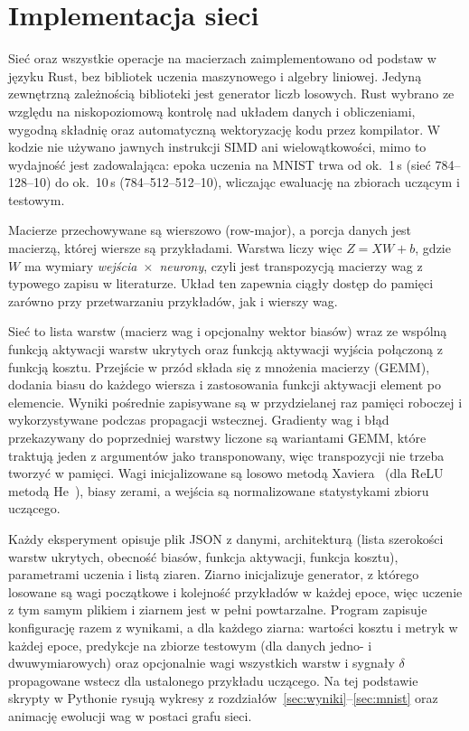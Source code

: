 \documentclass{article}
\begin{document}
\section{Implementacja sieci}
\label{sec:impl}

Sieć oraz wszystkie operacje na macierzach zaimplementowano od podstaw w języku Rust, bez bibliotek
uczenia maszynowego i algebry liniowej. Jedyną zewnętrzną zależnością biblioteki jest generator liczb
losowych. Rust wybrano ze względu na niskopoziomową kontrolę nad układem danych i obliczeniami,
wygodną składnię oraz automatyczną wektoryzację kodu przez kompilator. W kodzie nie używano jawnych
instrukcji SIMD ani wielowątkowości, mimo to wydajność jest zadowalająca: epoka uczenia na MNIST trwa
od ok.\ 1\,s (sieć 784--128--10) do ok.\ 10\,s (784--512--512--10), wliczając ewaluację na zbiorach
uczącym i testowym.

Macierze przechowywane są wierszowo (row-major), a porcja danych jest macierzą, której wiersze są
przykładami. Warstwa liczy więc $Z = XW + b$, gdzie $W$ ma wymiary
\emph{wejścia}~$\times$~\emph{neurony}, czyli jest transpozycją macierzy wag z
typowego zapisu w literaturze. Układ ten zapewnia ciągły dostęp do pamięci zarówno przy przetwarzaniu
przykładów, jak i wierszy wag.

Sieć to lista warstw (macierz wag i opcjonalny wektor biasów) wraz ze wspólną funkcją aktywacji
warstw ukrytych oraz funkcją aktywacji wyjścia połączoną z funkcją kosztu. Przejście w przód
składa się z mnożenia macierzy (GEMM), dodania biasu do każdego wiersza i zastosowania funkcji
aktywacji element po elemencie. Wyniki pośrednie zapisywane są w przydzielanej raz pamięci roboczej
i wykorzystywane podczas propagacji wstecznej. Gradienty wag i błąd przekazywany do poprzedniej
warstwy liczone są wariantami GEMM, które traktują jeden z argumentów jako transponowany, więc
transpozycji nie trzeba tworzyć w pamięci. Wagi inicjalizowane są losowo metodą
Xaviera~\cite{glorot2010} (dla ReLU metodą He~\cite{he2015}), biasy zerami, a wejścia są
normalizowane statystykami zbioru uczącego.

Każdy eksperyment opisuje plik JSON z danymi, architekturą (lista szerokości warstw ukrytych,
obecność biasów, funkcja aktywacji, funkcja kosztu), parametrami uczenia i listą ziaren. Ziarno
inicjalizuje generator, z którego losowane są wagi początkowe i kolejność przykładów w każdej epoce,
więc uczenie z tym samym plikiem i ziarnem jest w pełni powtarzalne. Program zapisuje konfigurację
razem z wynikami, a dla każdego ziarna: wartości kosztu i metryk w każdej epoce, predykcje
na zbiorze testowym (dla danych jedno- i dwuwymiarowych) oraz opcjonalnie wagi wszystkich warstw i sygnały $\delta$ propagowane wstecz
dla ustalonego przykładu uczącego. Na tej podstawie skrypty w Pythonie rysują wykresy z
rozdziałów~\ref{sec:wyniki}--\ref{sec:mnist} oraz animację ewolucji wag w postaci grafu sieci.
\end{document}
